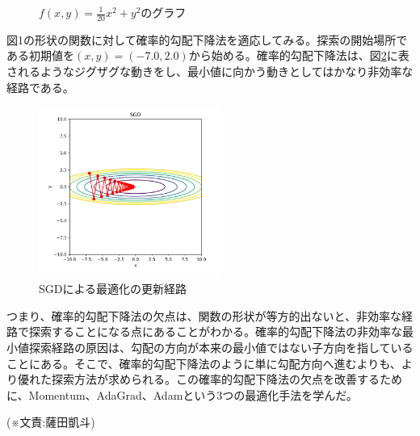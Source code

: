 {\begin{figure}[H]
\caption{$\displaystyle f(x,y) = \frac{1}{20}x^2 + y^2$のグラフ \label{gr1}}
\end{figure} 図1の形状の関数に対して確率的勾配下降法を適応してみる。探索の開始場所である初期値を$\displaystyle (x,y) = (-7.0, 2.0)$から始める。確率的勾配下降法は、図\ref{gr2}に表されるようなジグザグな動きをし、最小値に向かう動きとしてはかなり非効率な経路である。
\begin{figure}[H]
\centering
\includegraphics[width=6cm]{./figure/SGD.png}
\caption{SGDによる最適化の更新経路 \label{gr2}}
\end{figure}つまり、確率的勾配下降法の欠点は、関数の形状が等方的出ないと、非効率な経路で探索することになる点にあることがわかる。確率的勾配下降法の非効率な最小値探索経路の原因は、勾配の方向が本来の最小値ではない子方向を指していることにある。そこで、確率的勾配下降法のように単に勾配方向へ進むよりも、より優れた探索方法が求められる。この確率的勾配下降法の欠点を改善するために、Momentum、AdaGrad、Adamという3つの最適化手法を学んだ。
\begin{flushright}
  (※文責:薩田凱斗)
\end{flushright}

}




